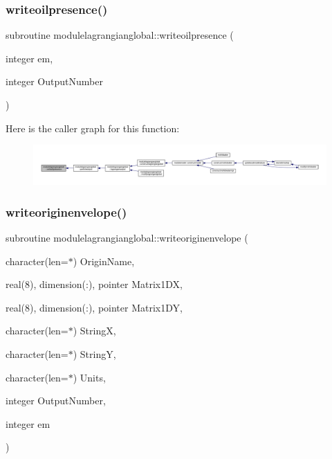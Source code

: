 \subsubsection{\texorpdfstring{writeoilpresence()}{writeoilpresence()}}
{\footnotesize\ttfamily subroutine modulelagrangianglobal\+::writeoilpresence (\begin{DoxyParamCaption}\item[{integer}]{em,  }\item[{integer}]{Output\+Number }\end{DoxyParamCaption})\hspace{0.3cm}{\ttfamily [private]}}

Here is the caller graph for this function\+:\nopagebreak
\begin{figure}[H]
\begin{center}
\leavevmode
\includegraphics[width=350pt]{namespacemodulelagrangianglobal_ab6a14231f1191c9852f886b90950db80_icgraph}
\end{center}
\end{figure}
\mbox{\label{namespacemodulelagrangianglobal_a50d81f13e10670a1b2e699246cbdaf1f}} 
\subsubsection{\texorpdfstring{writeoriginenvelope()}{writeoriginenvelope()}}
{\footnotesize\ttfamily subroutine modulelagrangianglobal\+::writeoriginenvelope (\begin{DoxyParamCaption}\item[{character(len=$\ast$)}]{Origin\+Name,  }\item[{real(8), dimension(\+:), pointer}]{Matrix1\+DX,  }\item[{real(8), dimension(\+:), pointer}]{Matrix1\+DY,  }\item[{character(len=$\ast$)}]{StringX,  }\item[{character(len=$\ast$)}]{StringY,  }\item[{character(len=$\ast$)}]{Units,  }\item[{integer}]{Output\+Number,  }\item[{integer}]{em }\end{DoxyParamCaption})\hspace{0.3cm}{\ttfamily [private]}}

